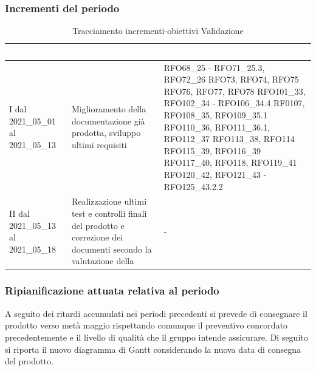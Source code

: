 \subsubsection{Incrementi del periodo}
\label{IncrementiValidazione}
\begin{table}[H]
	\begin{center}
		\begin{tabular}{ |C{3cm} C{6cm} C{7cm}| }
			\textcolor{white}{\textbf{Incremento}} & \textcolor{white}{\textbf{Obiettivi}} & \textcolor{white}{\textbf{Requisiti}} \\ \hline
			I dal 2021\_05\_01 al 2021\_05\_13& Miglioramento della documentazione già prodotta, sviluppo ultimi requisiti & RFO68\_25 - RFO71\_25.3, RFO72\_26 \newline
			RFO73,
			RFO74,
			RFO75 \newline
			RFO76, RFO77, RFO78 \newline
			RFO101\_33, RFO102\_34 - RFO106\_34.4 \newline
			RF0107,  RFO108\_35, RFO109\_35.1 \newline 
			RFO110\_36, RFO111\_36.1, RFO112\_37 \newline
			RFO113\_38, RFO114 \newline RFO115\_39, RFO116\_39 \newline
			RFO117\_40,
			RFO118, RFO119\_41 \newline
			RFO120\_42, RFO121\_43 - RFO125\_43.2.2
			\\ \hline
			II dal 2021\_05\_13 al 2021\_05\_18 	& 
			Realizzazione ultimi test e controlli finali del prodotto e correzione dei documenti secondo la valutazione della  & -\\ \hline
		\end{tabular}
		\caption{Tracciamento incrementi-obiettivi Validazione}
	\end{center}
\end{table}
\subsubsection{Ripianificazione attuata relativa al periodo} \label{RipianificazioneValidazione}
A seguito dei ritardi accumulati nei periodi precedenti si prevede di consegnare il prodotto verso metà maggio rispettando comunque il preventivo concordato precedentemente e il livello di qualità che il gruppo intende assicurare. Di seguito si riporta il nuovo diagramma di Gantt considerando la nuova data di consegna del prodotto.

